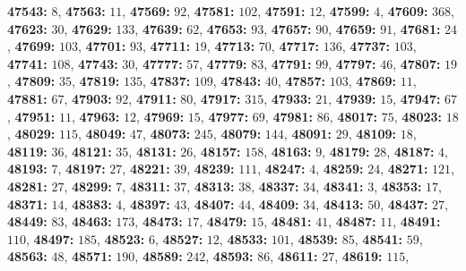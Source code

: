 \textsf{\bfseries 47543:} $8$, \textsf{\bfseries 47563:} $11$, \textsf{\bfseries 47569:} $92$, \textsf{\bfseries 47581:} $102$, \textsf{\bfseries 47591:} $12$, \textsf{\bfseries 47599:} $4$, \textsf{\bfseries 47609:} $368$, \textsf{\bfseries 47623:} $30$, \textsf{\bfseries 47629:} $133$, \textsf{\bfseries 47639:} $62$, \textsf{\bfseries 47653:} $93$, \textsf{\bfseries 47657:} $90$, \textsf{\bfseries 47659:} $91$, \textsf{\bfseries 47681:} $24$, \textsf{\bfseries 47699:} $103$, \textsf{\bfseries 47701:} $93$, \textsf{\bfseries 47711:} $19$, \textsf{\bfseries 47713:} $70$, \textsf{\bfseries 47717:} $136$, \textsf{\bfseries 47737:} $103$, \textsf{\bfseries 47741:} $108$, \textsf{\bfseries 47743:} $30$, \textsf{\bfseries 47777:} $57$, \textsf{\bfseries 47779:} $83$, \textsf{\bfseries 47791:} $99$, \textsf{\bfseries 47797:} $46$, \textsf{\bfseries 47807:} $19$, \textsf{\bfseries 47809:} $35$, \textsf{\bfseries 47819:} $135$, \textsf{\bfseries 47837:} $109$, \textsf{\bfseries 47843:} $40$, \textsf{\bfseries 47857:} $103$, \textsf{\bfseries 47869:} $11$, \textsf{\bfseries 47881:} $67$, \textsf{\bfseries 47903:} $92$, \textsf{\bfseries 47911:} $80$, \textsf{\bfseries 47917:} $315$, \textsf{\bfseries 47933:} $21$, \textsf{\bfseries 47939:} $15$, \textsf{\bfseries 47947:} $67$, \textsf{\bfseries 47951:} $11$, \textsf{\bfseries 47963:} $12$, \textsf{\bfseries 47969:} $15$, \textsf{\bfseries 47977:} $69$, \textsf{\bfseries 47981:} $86$, \textsf{\bfseries 48017:} $75$, \textsf{\bfseries 48023:} $18$, \textsf{\bfseries 48029:} $115$, \textsf{\bfseries 48049:} $47$, \textsf{\bfseries 48073:} $245$, \textsf{\bfseries 48079:} $144$, \textsf{\bfseries 48091:} $29$, \textsf{\bfseries 48109:} $18$, \textsf{\bfseries 48119:} $36$, \textsf{\bfseries 48121:} $35$, \textsf{\bfseries 48131:} $26$, \textsf{\bfseries 48157:} $158$, \textsf{\bfseries 48163:} $9$, \textsf{\bfseries 48179:} $28$, \textsf{\bfseries 48187:} $4$, \textsf{\bfseries 48193:} $7$, \textsf{\bfseries 48197:} $27$, \textsf{\bfseries 48221:} $39$, \textsf{\bfseries 48239:} $111$, \textsf{\bfseries 48247:} $4$, \textsf{\bfseries 48259:} $24$, \textsf{\bfseries 48271:} $121$, \textsf{\bfseries 48281:} $27$, \textsf{\bfseries 48299:} $7$, \textsf{\bfseries 48311:} $37$, \textsf{\bfseries 48313:} $38$, \textsf{\bfseries 48337:} $34$, \textsf{\bfseries 48341:} $3$, \textsf{\bfseries 48353:} $17$, \textsf{\bfseries 48371:} $14$, \textsf{\bfseries 48383:} $4$, \textsf{\bfseries 48397:} $43$, \textsf{\bfseries 48407:} $44$, \textsf{\bfseries 48409:} $34$, \textsf{\bfseries 48413:} $50$, \textsf{\bfseries 48437:} $27$, \textsf{\bfseries 48449:} $83$, \textsf{\bfseries 48463:} $173$, \textsf{\bfseries 48473:} $17$, \textsf{\bfseries 48479:} $15$, \textsf{\bfseries 48481:} $41$, \textsf{\bfseries 48487:} $11$, \textsf{\bfseries 48491:} $110$, \textsf{\bfseries 48497:} $185$, \textsf{\bfseries 48523:} $6$, \textsf{\bfseries 48527:} $12$, \textsf{\bfseries 48533:} $101$, \textsf{\bfseries 48539:} $85$, \textsf{\bfseries 48541:} $59$, \textsf{\bfseries 48563:} $48$, \textsf{\bfseries 48571:} $190$, \textsf{\bfseries 48589:} $242$, \textsf{\bfseries 48593:} $86$, \textsf{\bfseries 48611:} $27$, \textsf{\bfseries 48619:} $115$, 
